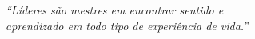 \begin{epigrafe}
    \vspace*{\fill}
	\begin{flushright}
		\textit{``Líderes são mestres em encontrar sentido e \\
		aprendizado em todo tipo de experiência de vida.''\\
		\cite[p.~94]{juca2014}}
	\end{flushright}
\end{epigrafe}